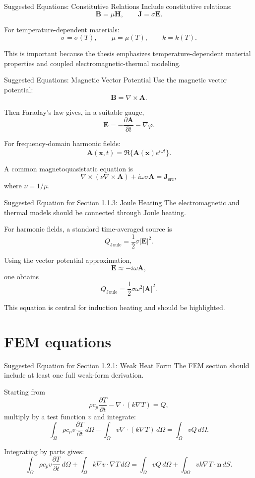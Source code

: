 \documentclass[aspectratio=169]{beamer}
\begin{document}
\begin{frame}{Suggested Equations: Constitutive Relations}
Include constitutive relations:
\[
\mathbf{B}=\mu \mathbf{H},
\qquad
\mathbf{J}=\sigma \mathbf{E}.
\]

For temperature-dependent materials:
\[
\sigma=\sigma(T),
\qquad
\mu=\mu(T),
\qquad
k=k(T).
\]

This is important because the thesis emphasizes temperature-dependent material properties and coupled electromagnetic-thermal modeling.
\end{frame}

\begin{frame}{Suggested Equations: Magnetic Vector Potential}
Use the magnetic vector potential:
\[
\mathbf{B}=\nabla\times \mathbf{A}.
\]

Then Faraday's law gives, in a suitable gauge,
\[
\mathbf{E}=-\frac{\partial \mathbf{A}}{\partial t}-\nabla \varphi.
\]

For frequency-domain harmonic fields:
\[
\mathbf{A}(\mathbf{x},t)=\Re\{\mathbf{A}(\mathbf{x})e^{i\omega t}\}.
\]

A common magnetoquasistatic equation is
\[
\nabla\times\left(\nu\nabla\times \mathbf{A}\right)
+
i\omega\sigma \mathbf{A}
=
\mathbf{J}_{\mathrm{src}},
\]
where \(\nu=1/\mu\).
\end{frame}

\begin{frame}{Suggested Equation for Section 1.1.3: Joule Heating}
The electromagnetic and thermal models should be connected through Joule heating.

For harmonic fields, a standard time-averaged source is
\[
Q_{\mathrm{Joule}}
=
\frac{1}{2}\sigma |\mathbf{E}|^2.
\]

Using the vector potential approximation,
\[
\mathbf{E}\approx -i\omega \mathbf{A},
\]
one obtains
\[
Q_{\mathrm{Joule}}
=
\frac{1}{2}\sigma \omega^2 |\mathbf{A}|^2.
\]

This equation is central for induction heating and should be highlighted.
\end{frame}

\section{FEM equations}

\begin{frame}{Suggested Equation for Section 1.2.1: Weak Heat Form}
The FEM section should include at least one full weak-form derivation.

Starting from
\[
\rho c_p \frac{\partial T}{\partial t}
-
\nabla\cdot(k\nabla T)
=
Q,
\]
multiply by a test function \(v\) and integrate:
\[
\int_\Omega \rho c_p v \frac{\partial T}{\partial t}\,d\Omega
-
\int_\Omega v\nabla\cdot(k\nabla T)\,d\Omega
=
\int_\Omega vQ\,d\Omega.
\]

Integrating by parts gives:
\[
\int_\Omega \rho c_p v \frac{\partial T}{\partial t}\,d\Omega
+
\int_\Omega k\nabla v\cdot \nabla T\,d\Omega
=
\int_\Omega vQ\,d\Omega
+
\int_{\partial\Omega} v k\nabla T\cdot \mathbf{n}\,dS.
\]
\end{frame}
\end{document}

